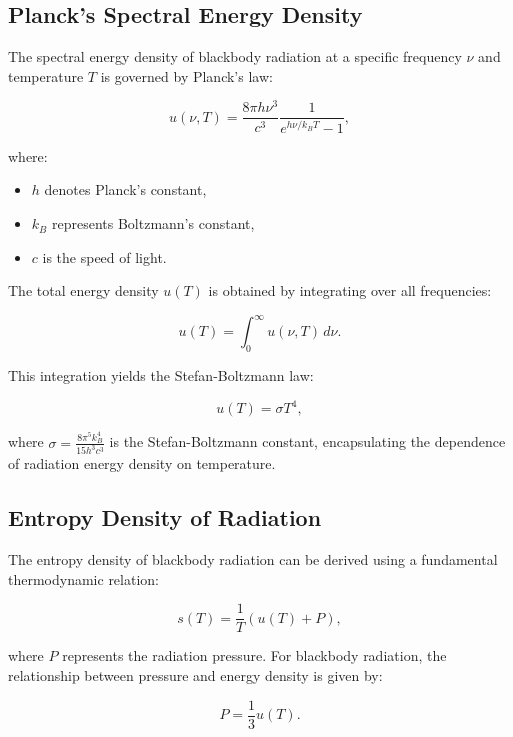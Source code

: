 \documentclass[a4paper,10pt]{article}
\begin{document}
 \subsection*{Planck's Spectral Energy Density}
 The spectral energy density of blackbody radiation at a specific frequency $\nu$ and temperature $T$ is governed by Planck's law:

 \begin{equation*}
  u(\nu, T) = \frac{8 \pi h \nu^3}{c^3} \frac{1}{e^{h \nu / k_B T} - 1},
 \end{equation*}

 where:

 \begin{itemize}
  \item $h$ denotes Planck's constant,
  \item $k_B$ represents Boltzmann's constant,
  \item $c$ is the speed of light.
 \end{itemize}

 The total energy density $u(T)$ is obtained by integrating over all frequencies:

 \begin{equation*}
  u(T) = \int_0^\infty u(\nu, T) \, d\nu.
 \end{equation*}

 This integration yields the Stefan-Boltzmann law:

 \begin{equation*}
  u(T) = \sigma T^4,
 \end{equation*}

 where $\sigma = \frac{8 \pi^5 k_B^4}{15 h^3 c^3}$ is the Stefan-Boltzmann constant, encapsulating the dependence of radiation energy density on temperature.

 \subsection*{Entropy Density of Radiation}
 The entropy density of blackbody radiation can be derived using a fundamental thermodynamic relation:

 \begin{equation*}
  s(T) = \frac{1}{T} \left( u(T) + P \right),
 \end{equation*}

 where $P$ represents the radiation pressure. For blackbody radiation, the relationship between pressure and energy density is given by:

 \begin{equation*}
  P = \frac{1}{3} u(T).
 \end{equation*}
\end{document}
